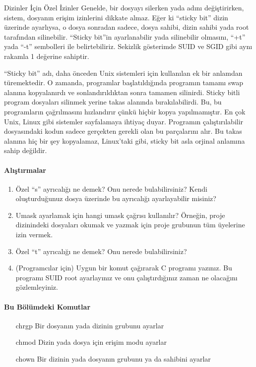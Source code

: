 \begin{section}{Dizinler İçin Özel İzinler}
Genelde, bir dosyayı silerken yada adını değiştirirken, sistem, dosyanın erişim izinlerini dikkate almaz. Eğer ki “sticky bit” dizin üzerinde ayarlıysa, o dosya sonradan sadece, dosya sahibi, dizin sahibi yada root tarafından silinebilir. “Sticky bit”in ayarlanabilir yada silinebilir olmasını, “+t” yada “-t” sembolleri ile belirtebiliriz. Sekizlik gösterimde SUID ve SGID gibi aynı rakamla 1 değerine sahiptir.

“Sticky bit” adı, daha önceden Unix sistemleri için kullanılan ek bir anlamdan türemektedir. O zamanda, programlar başlatıldığında programın tamamı swap alanına kopyalanırdı ve sonlandırıldıktan sonra tamamen silinirdi. Sticky bitli program dosyaları silinmek yerine takas alanında bırakılabilirdi. Bu, bu programların çağrılmasını hızlandırır çünkü hiçbir kopya yapılmamıştır. En çok Unix, Linux gibi sistemler sayfalamaya ihtiyaç duyar. Programın çalıştırılabilir dosyasındaki kodun sadece gerçekten gerekli olan bu parçalarını alır. Bu takas alanına hiç bir şey kopyalamaz, Linux'taki gibi, sticky bit asla orjinal anlamına sahip değildir.

\paragraph{{\Huge{\PencilLeftDown}}Alıştırmalar}{
\begin{enumerate}
 \item Özel “s” ayrıcalığı ne demek? Onu nerede bulabilirsiniz? Kendi oluşturduğunuz dosya üzerinde bu ayrıcalığı ayarlayabilir misiniz?
 \item Umask ayarlamak için hangi umask çağrısı kullanılır? Örneğin, proje dizinindeki dosyaları okumak ve yazmak için proje grubunun tüm üyelerine izin vermek.
 \item Özel “t” ayrıcalığı ne demek? Onu nerede bulabilirsiniz?
 \item (Programcılar için) Uygun bir komut çağırarak C programı yazınız. Bu programı SUID root ayarlayınız ve onu çalıştırdığınız zaman ne olacağını gözlemleyiniz.
 \end{enumerate}}

\paragraph{Bu Bölümdeki Komutlar}{
\begin{itemize}
\item[chrgp]Bir dosyanın yada dizinin grubunu ayarlar
\item[chmod]Dizin yada dosya için erişim modu ayarlar
\item[chown]Bir dizinin yada dosyanın grubunu ya da sahibini ayarlar
\end{itemize}}


\end{section}
